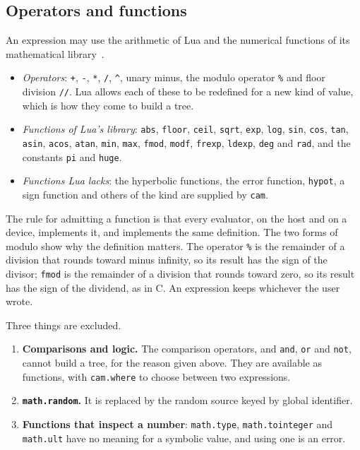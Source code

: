 \documentclass[11pt,a4paper]{article}
\newcommand{\code}[1]{\texttt{#1}}
\begin{document}
\subsection{Operators and functions}
\label{sec:expr-functions}

An expression may use the arithmetic of Lua and the numerical functions of
its mathematical library~\cite{lua55}.

\begin{itemize}
  \item \emph{Operators}: \code{+}, \code{-}, \code{*}, \code{/},
        \code{\textasciicircum}, unary minus, the modulo operator \code{\%}
        and floor division \code{//}.  Lua allows each of these to be
        redefined for a new kind of value, which is how they come to build
        a tree.
  \item \emph{Functions of Lua's library}: \code{abs}, \code{floor},
        \code{ceil}, \code{sqrt}, \code{exp}, \code{log}, \code{sin},
        \code{cos}, \code{tan}, \code{asin}, \code{acos}, \code{atan},
        \code{min}, \code{max}, \code{fmod}, \code{modf}, \code{frexp},
        \code{ldexp}, \code{deg} and \code{rad}, and the constants
        \code{pi} and \code{huge}.
  \item \emph{Functions Lua lacks}: the hyperbolic functions, the error
        function, \code{hypot}, a sign function and others of the kind are
        supplied by \code{cam}.
\end{itemize}

The rule for admitting a function is that every evaluator, on the host and
on a device, implements it, and implements the same definition.  The two
forms of modulo show why the definition matters.  The operator \code{\%}
is the remainder of a division that rounds toward minus infinity, so its
result has the sign of the divisor; \code{fmod} is the remainder of a
division that rounds toward zero, so its result has the sign of the
dividend, as in C.  An expression keeps whichever the user wrote.

Three things are excluded.

\begin{enumerate}
  \item \textbf{Comparisons and logic.}  The comparison operators, and
        \code{and}, \code{or} and \code{not}, cannot build a tree, for the
        reason given above.  They are available as functions, with
        \code{cam.where} to choose between two expressions.
  \item \textbf{\code{math.random}.}  It is replaced by the random source
        keyed by global identifier.
  \item \textbf{Functions that inspect a number}: \code{math.type},
        \code{math.tointeger} and \code{math.ult} have no meaning for a
        symbolic value, and using one is an error.
\end{enumerate}
\end{document}
